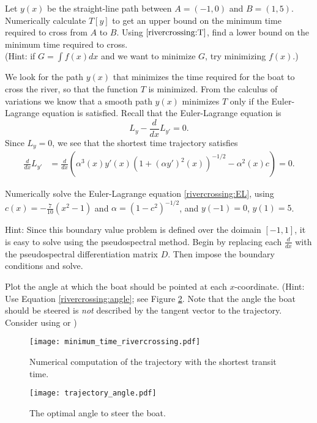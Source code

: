 \begin{problem}
	Let $y(x)$ be the straight-line path between $A = (-1,0)$ and $B=(1,5)$. Numerically calculate $T[y]$ to get an upper bound on the minimum time required to cross from $A$ to $B$. Using $\eqref{rivercrossing:T}$, find a lower bound on the minimum time required to cross.
	\\(Hint: if $G=\int f(x)dx$ and we want to minimize $G$, try minimizing $f(x)$.)
\end{problem}

We look for the path $y(x)$ that minimizes the time required for the boat to cross the river, so that the function $T$ is minimized. From the calculus of variations we know that a smooth path $y(x)$ minimizes $T$ only if the Euler-Lagrange equation is satisfied. Recall that the Euler-Lagrange equation is 
\[
L_{y} - \frac{d}{dx}L_{y'} = 0.
\]
Since $L_y = 0$, we see that the shortest time trajectory satisfies
\begin{align}
	\frac{d}{dx}L_{y'} &=  \frac{d}{dx}\left( \alpha^3(x) y'(x) (1 + (\alpha y')^2(x))^{-1/2} - \alpha^2(x) c \right) = 0.
	\label{rivercrossing:EL}
\end{align}

\begin{problem}
Numerically solve the Euler-Lagrange equation \eqref{rivercrossing:EL}, using $c(x) = -\frac{7}{10}(x^2-1)$ and $\alpha = (1-c^2)^{-1/2}$, and $y(-1) = 0$, $y(1) = 5$. 

Hint: Since this boundary value problem is defined over the doimain $[-1,1]$, it is easy to solve using the pseudospectral method. Begin by replacing each $\frac{d}{dx}$ with the pseudospectral differentiation matrix $D$. Then impose the boundary conditions and solve.
\end{problem}

\begin{problem}
Plot the angle at which the boat should be pointed at each $x$-coordinate. (Hint: Use  Equation \eqref{rivercrossing:angle}; see Figure \ref{fig:rivercrossing_angle}. Note that the angle the boat should be steered is \emph{not} described by the tangent vector to the trajectory. Consider using  or )
\end{problem}

\begin{figure}
\centering
\texttt{[image: minimum\_time\_rivercrossing.pdf]}
\caption{Numerical computation of the trajectory with the shortest transit time.}
\label{fig:rivercrossing_trajectory}
\end{figure}



\begin{figure}
\centering
\texttt{[image: trajectory\_angle.pdf]}
\caption{The optimal angle to steer the boat.}
\label{fig:rivercrossing_angle}
\end{figure}






